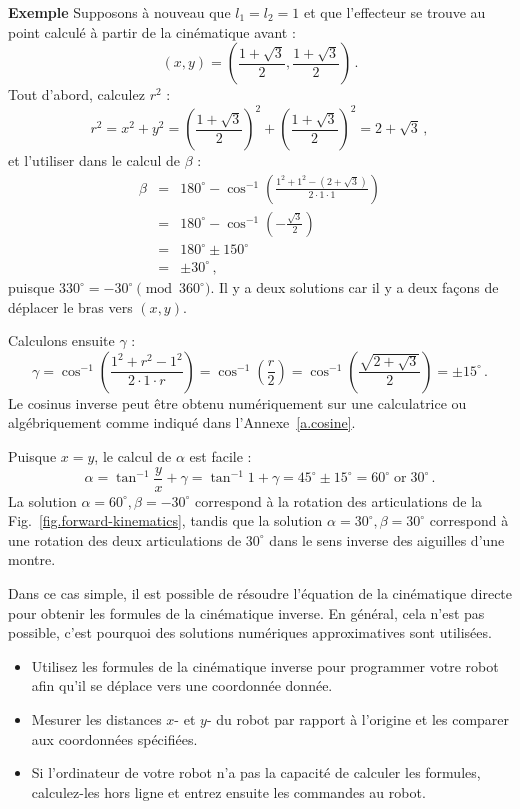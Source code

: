 \noindent\textbf{Exemple} Supposons à nouveau que $l_1 = l_2 = 1$ et que l'effecteur se trouve au point calculé à partir de la cinématique avant :
\[
(x,y) = \left(\frac{1+\sqrt{3}}{2},\frac{1+\sqrt{3}}{2}\right)\,.
\]
Tout d'abord, calculez $r^2$ :
\[
r^2 = x^2+y^2 = \left( \frac{1+\sqrt{3}}{2}\right)^2 + \left( \frac{1+\sqrt{3}}{2}\right)^2 = 2+\sqrt{3}\,,
\]
et l'utiliser dans le calcul de $\beta$ :
\begin{eqnarray*}
\beta &=& 180^{\circ} - \cos^{-1} \left(\frac{1^2 + 1^2 - (2+\sqrt{3})}{2\cdot 1\cdot 1}\right)\\
&=& 180^{\circ} - \cos^{-1}\left(-\frac{\sqrt{3}}{2}\right)\\
&=& 180^{\circ} \pm 150^{\circ}\\
&=& \pm 30^{\circ}\,,
\end{eqnarray*}
puisque $330^{\circ}=-30^{\circ} \!\!\!\pmod{360^\circ}$. Il y a deux solutions car il y a deux façons de déplacer le bras vers $(x,y)$.

Calculons ensuite $\gamma$ :
\begin{equation}
\gamma = \cos^{-1}\left(\frac{1^2 + r^2 - 1^2}{2\cdot 1 \cdot r}\right) = \cos^{-1}\left(\frac{r}{2}\right)= \cos^{-1}\left(\frac{\sqrt{2+\sqrt{3}}}{2}\right) = \pm 15^{\circ}\,.\label{eq.cos15}
\end{equation}
Le cosinus inverse peut être obtenu numériquement sur une calculatrice ou algébriquement comme indiqué dans l'Annexe~\ref{a.cosine}.

Puisque $x=y$, le calcul de $\alpha$ est facile :
\[\alpha = \tan^{-1}\frac{y}{x} + \gamma = \tan^{-1}1 + \gamma = 45^{\circ} \pm 15^{\circ} = 60^{\circ} \;\textrm{or}\; 30^{\circ}\,.
\]
La solution $\alpha=60^{\circ},\beta=-30^{\circ}$ correspond à la rotation des articulations de la Fig.~\ref{fig.forward-kinematics}, tandis que la solution $\alpha=30^{\circ},\beta=30^{\circ}$ correspond à une rotation des deux articulations de $30^{\circ}$ dans le sens inverse des aiguilles d'une montre.

Dans ce cas simple, il est possible de résoudre l'équation de la cinématique directe pour obtenir les formules de la cinématique inverse. En général, cela n'est pas possible, c'est pourquoi des solutions numériques approximatives sont utilisées.

\begin{framed}
\begin{itemize}
\item Utilisez les formules de la cinématique inverse pour programmer votre robot afin qu'il se déplace vers une coordonnée donnée.
\item Mesurer les distances $x$- et $y$- du robot par rapport à l'origine et les comparer aux coordonnées spécifiées.
\item Si l'ordinateur de votre robot n'a pas la capacité de calculer les formules, calculez-les hors ligne et entrez ensuite les commandes au robot.
\end{itemize}
\end{framed}

